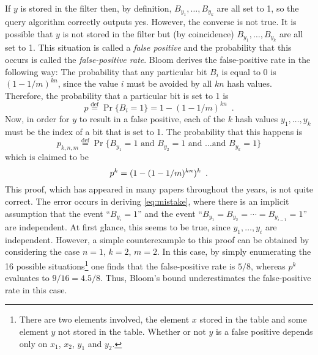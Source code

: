 \documentclass[lotsofwhite]{patmorin}
\begin{document}
If $y$ is stored in the filter then, by definition,
$B_{y_1},\ldots,B_{y_k}$ are all set to 1, so the query algorithm
correctly outputs yes.  However, the converse is not true.  It is
possible that $y$ is not stored in the filter but (by coincidence)
$B_{y_1},\ldots,B_{y_k}$ are all set to 1.  This situation is called a
\emph{false positive} and the probability that this occurs is called
the \emph{false-positive rate}.  Bloom derives the false-positive rate
in the following way: The probability that any particular bit $B_i$ is
equal to 0 is $(1-1/m)^{kn}$, since the value $i$ must be avoided by
all $kn$ hash values.   Therefore, the probability that a particular
bit is set to 1 is 
\[
	p\stackrel{\mathrm{def}}{=}\Pr\{B_i=1\}=1-(1-1/m)^{kn} \enspace .
\]
Now, in order for $y$ to result in a false positive, each of the $k$
hash values $y_1,\ldots,y_k$ must be the index of a bit that is set to
1.  The probability that this happens is 
\[
	p_{k,n,m} \stackrel{\mathrm{def}}{=} 
	\Pr\{\mbox{$B_{y_1}=1$ and $B_{y_2}=1$ and \ldots and $B_{y_k}=1$}\}
\]
which is claimed to be
\begin{equation}         
	p^k = (1-(1-1/m)^{kn})^k \enspace .  \eqlabel{mistake}
\end{equation}
This proof, which has appeared in many papers
throughout the years, is not quite correct. The error occurs in deriving
\eqref{eq:mistake}, where there is an implicit assumption that the
event ``$B_{y_i}=1$'' and the event ``$B_{y_1}=B_{y_2}=\cdots
=B_{y_{i-1}}=1$'' are independent.  At first glance, this seems to be
true, since $y_1,\ldots,y_i$ are independent.  However, a simple
counterexample to this proof can be obtained by considering the case
$n=1$, $k=2$, $m=2$.  In this case, by simply enumerating the 16
possible situations\footnote{There are two elements involved, the
element $x$ stored in the table and some element $y$ not stored in the
table.  Whether or not $y$ is a false positive depends only on $x_1$,
$x_2$, $y_1$ and $y_2$.} one finds that the false-positive rate is
$5/8$, whereas $p^k$ evaluates to $9/16=4.5/8$.  Thus,
Bloom's bound underestimates the false-positive rate in this case.
\end{document}
